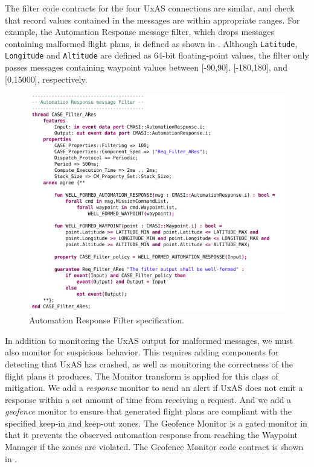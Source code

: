 The filter code contracts for the four UxAS connections are similar, and check that record values contained in the messages are within appropriate ranges.  For example, the Automation Response message filter, which drops messages containing malformed flight plans, is defined as shown in .  Although \texttt{Latitude}, \texttt{Longitude} and \texttt{Altitude} are defined as 64-bit floating-point values, the filter only passes messages containing waypoint values between [-90,90], [-180,180], and [0,15000], respectively.

\begin{figure}[h]
	\centering
	\includegraphics[width=1\columnwidth]{figs/automation-response-filter.png}
	\caption{Automation Response Filter specification.}
	\label{fig:automation-response-filter}
\end{figure}

In addition to monitoring the UxAS output for malformed messages, we must also monitor for suspicious behavior.  This requires adding components for detecting that UxAS has crashed, as well as monitoring the correctness of the flight plans it produces.  The Monitor transform is applied for this class of mitigation.  We add a \textit{response} monitor to send an alert if UxAS does not emit a response within a set amount of time from receiving a request.  And we add a \textit{geofence} monitor to ensure that generated flight plans are compliant with the specified keep-in and keep-out zones.  The Geofence Monitor is a gated monitor in that it prevents the observed automation response from reaching the Waypoint Manager if the zones are violated.
The Geofence Monitor code contract is shown in .

